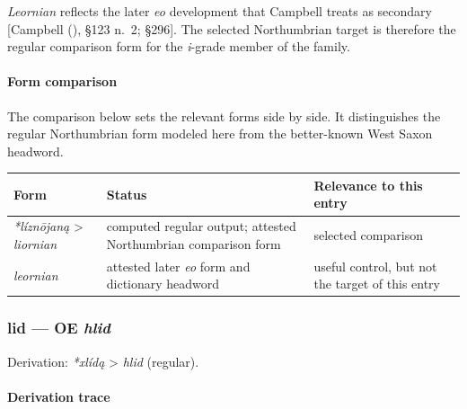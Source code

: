\documentclass[
  british,
  a4paper,
]{article}
\newcounter{none} %
\begin{document}
\emph{Leornian} reflects the later \emph{eo} development that Campbell
treats as secondary {[}Campbell (),
§123 n.~2; §296{]}. The selected Northumbrian target is therefore the
regular comparison form for the \emph{i}-grade member of the family.

\paragraph{Form comparison}\label{form-comparison-1}

The comparison below sets the relevant forms side by side. It
distinguishes the regular Northumbrian form modeled here from the
better-known West Saxon headword.

{\def\LTcaptype{none} %
\begin{longtable}[]{@{}
  >{\raggedright\arraybackslash}p{}
  >{\raggedright\arraybackslash}p{}
  >{\raggedright\arraybackslash}p{}@{}}
\toprule\noalign{}
\begin{minipage}[b]{\linewidth}\raggedright
Form
\end{minipage} & \begin{minipage}[b]{\linewidth}\raggedright
Status
\end{minipage} & \begin{minipage}[b]{\linewidth}\raggedright
Relevance to this entry
\end{minipage} \\
\midrule\noalign{}
\endhead
\bottomrule\noalign{}
\endlastfoot
\emph{*líznōjaną} \textgreater{} \emph{liornian} & computed regular
output; attested Northumbrian comparison form & selected comparison \\
\emph{leornian} & attested later \emph{eo} form and dictionary headword
& useful control, but not the target of this entry \\
\end{longtable}
}

\subsubsection{\texorpdfstring{lid --- OE
\emph{hlid}}{lid --- OE hlid}}\label{lid-oe-hlid}

Derivation: \emph{*xlídą} \textgreater{} \emph{hlid} (regular).

\paragraph{Derivation trace}\label{derivation-trace-42}
\end{document}
